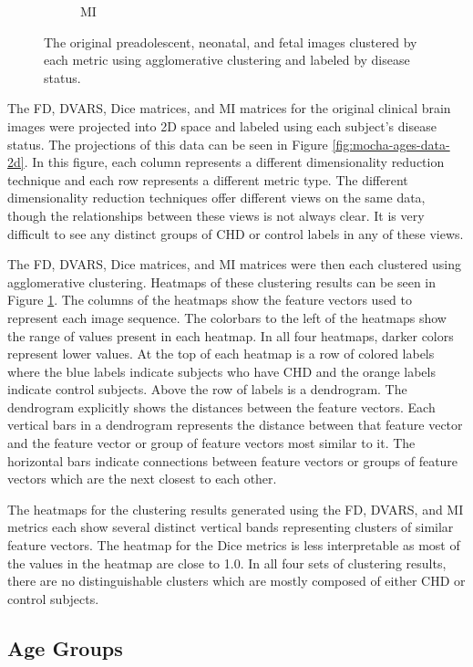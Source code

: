 \begin{figure}[]
\begin{subfigure}{0.49\textwidth}
		\caption{MI}
	\end{subfigure}
\caption{The original preadolescent, neonatal, and fetal images clustered by each metric using agglomerative clustering and labeled by disease status.}
\label{fig:mocha-cohorts-sns-agg}
\end{figure}

The FD, DVARS, Dice matrices, and MI matrices for the original clinical brain images were projected into 2D space and labeled using each subject's disease status. The projections of this data can be seen in Figure \ref{fig:mocha-ages-data-2d}. In this figure, each column represents a different dimensionality reduction technique and each row represents a different metric type. The different dimensionality reduction techniques offer different views on the same data, though the relationships between these views is not always clear. It is very difficult to see any distinct groups of CHD or control labels in any of these views.

The FD, DVARS, Dice matrices, and MI matrices were then each clustered using agglomerative clustering. Heatmaps of these clustering results can be seen in Figure \ref{fig:mocha-cohorts-sns-agg}. The columns of the heatmaps show the feature vectors used to represent each image sequence. The colorbars to the left of the heatmaps show the range of values present in each heatmap. In all four heatmaps, darker colors represent lower values. At the top of each heatmap is a row of colored labels where the blue labels indicate subjects who have CHD and the orange labels indicate control subjects. Above the row of labels is a dendrogram. The dendrogram explicitly shows the distances between the feature vectors. Each vertical bars in a dendrogram represents the distance between that feature vector and the feature vector or group of feature vectors most similar to it. The horizontal bars indicate connections between feature vectors or groups of feature vectors which are the next closest to each other.

The heatmaps for the clustering results generated using the FD, DVARS, and MI metrics each show several distinct vertical bands representing clusters of similar feature vectors. The heatmap for the Dice metrics is less interpretable as most of the values in the heatmap are close to 1.0. In all four sets of clustering results, there are no distinguishable clusters which are mostly composed of either CHD or control subjects.

\subsection{Age Groups}

